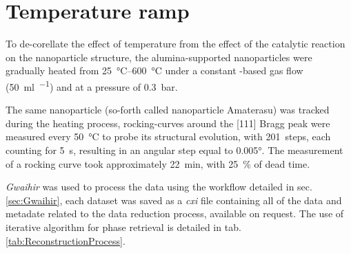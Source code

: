 \section{Temperature ramp}\label{sec:TempRampBCDI}


To de-corellate the effect of temperature from the effect of the catalytic reaction on the nanoparticle structure, the alumina-supported nanoparticles were gradually heated from \qtyrange{25}{600}{\degreeCelsius} under a constant \argon-based gas flow (\qty{50}{\ml\per\min}) and at a pressure of \qty{0.3}{\bar}.

The same nanoparticle (so-forth called nanoparticle Amaterasu) was tracked during the heating process, rocking-curves around the [111] Bragg peak were measured every \qty{50}{\degreeCelsius} to probe its structural evolution, with \qty{201}{steps}, each counting for \qty{5}{\second}, resulting in an angular step equal to \ang{0.005}.
The measurement of a rocking curve took approximately \qty{22}{\minute}, with \qty{25}{\percent} of dead time.

\textit{Gwaihir} was used to process the data using the workflow detailed in sec. \ref{sec:Gwaihir}, each dataset was saved as a \textit{cxi} file containing all of the data and metadate related to the data reduction process, available on request.
The use of iterative algorithm for phase retrieval is detailed in tab. \ref{tab:ReconstructionProcess}.

\begin{table}[!htb]
\centering
{}
\caption{Example of algorithm chain used in BCDI for the phase retrieval.}
\label{tab:ReconstructionProcess}
\end{table}

